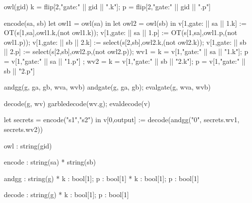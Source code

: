 {\footnotesize
\begin{verbatimtab}
  owl(gid) { { k = flip[2,"gate:" || gid || ".k"]; p = flip[2,"gate:" || gid || ".p"] } }

  encode(sa, sb) {
    let owl1 = owl(sa) in
    let owl2 = owl(sb) in
    v[1,gate: || sa || 1.k] := OT(s[1,sa],owl1.k,(not owl1.k));
    v[1,gate: || sa || 1.p] := OT(s[1,sa],owl1.p,(not owl1.p));
    v[1,gate: || sb || 2.k] := select(s[2,sb],owl2.k,(not owl2.k));
    v[1,gate: || sb || 2.p] := select(s[2,sb],owl2.p,(not owl2.p));
    { wv1 = { k = v[1,"gate:" || sa || "1.k"]; p = v[1,"gate:" || sa || "1.p"] };
      wv2 = { k = v[1,"gate:" || sb || "2.k"]; p = v[1,"gate:" || sb || "2.p"] } }
  }

  andgg(g, ga, gb, wva, wvb) { andgate(g, ga, gb); evalgate(g, wva, wvb) }

  decode(g, wv) { garbledecode(wv.g); evaldecode(v) }
\end{verbatimtab}
}

{\footnotesize
\begin{verbatimtab}
  let secrets = encode("s1","s2") in v[0,output] := decode(andgg("0", secrets.wv1, secrets.wv2)) \end{verbatimtab}
}

{\footnotesize
\begin{verbatimtab}
  owl    :   string(gid)
  
  encode :   string(sa) * string(sb)
  
  andgg  :  string(g) * { k : bool[1]; p : bool[1] } *  { k : bool[1]; p : bool[1] }

  decode :  string(g) * { k : bool[1]; p : bool[1] }
\end{verbatimtab}
}
